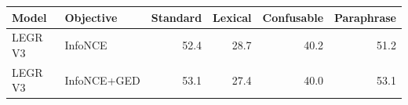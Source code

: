 \begin{tabular}{llrrrr}
\toprule
Model & Objective & Standard & Lexical & Confusable & Paraphrase \\
\midrule
LEGR V3 & InfoNCE & 52.4 & 28.7 & 40.2 & 51.2 \\
LEGR V3 & InfoNCE+GED & 53.1 & 27.4 & 40.0 & 53.1 \\
\bottomrule
\end{tabular}
